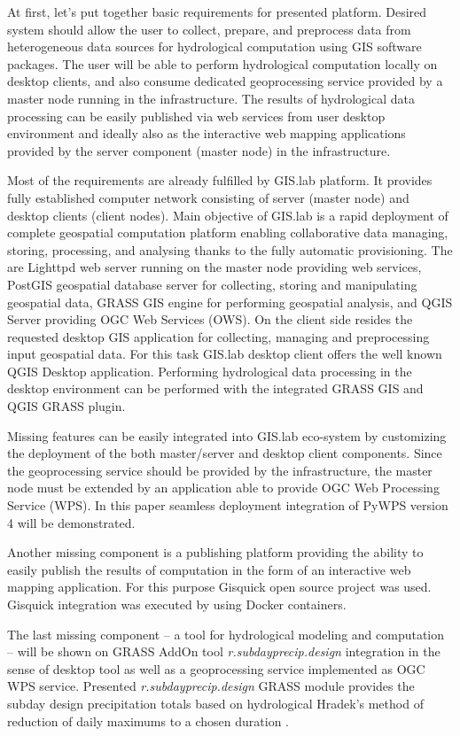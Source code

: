 \documentclass{isprs}
\begin{document}
At first, let's put together basic requirements for presented
platform. Desired system should allow the user to collect, prepare,
and preprocess data from heterogeneous data sources for hydrological
computation using GIS software packages. The user will be able to
perform hydrological computation locally on desktop clients, and also
consume dedicated geoprocessing service provided by a master node
running in the infrastructure. The results of hydrological data
processing can be easily published via web services from user desktop
environment and ideally also as the interactive web mapping
applications provided by the server component (master node) in the
infrastructure.

Most of the requirements are already fulfilled by GIS.lab platform. It
provides fully established computer network consisting of server
(master node) and desktop clients (client nodes). Main objective of
GIS.lab is a rapid deployment of complete geospatial computation
platform enabling collaborative data managing, storing, processing,
and analysing thanks to the fully automatic provisioning. The are
Lighttpd web server running on the master node providing web services,
PostGIS geospatial database server for collecting, storing and
manipulating geospatial data, GRASS GIS engine for performing
geospatial analysis, and QGIS Server providing OGC Web Services
(OWS). On the client side resides the requested desktop GIS
application for collecting, managing and preprocessing input
geospatial data. For this task GIS.lab desktop client offers the well
known QGIS Desktop application. Performing hydrological data
processing in the desktop environment can be performed with the
integrated GRASS GIS and QGIS GRASS plugin.

Missing features can be easily integrated into GIS.lab eco-system by
customizing the deployment of the both master/server and desktop
client components. Since the geoprocessing service should be provided
by the infrastructure, the master node must be extended by an
application able to provide OGC Web Processing Service (WPS). In this
paper seamless deployment integration of PyWPS version 4 will be
demonstrated.

Another missing component is a publishing platform providing the
ability to easily publish the results of computation in the form of an
interactive web mapping application. For this purpose Gisquick open
source project was used. Gisquick integration was executed by using
Docker containers.

The last missing component -- a tool for hydrological modeling and
computation -- will be shown on GRASS AddOn tool
\textit{r.subdayprecip.design} integration in the sense of desktop
tool as well as a geoprocessing service implemented as OGC WPS
service. Presented \textit{r.subdayprecip.design} GRASS module
provides the subday design precipitation totals based on hydrological
Hradek's method of reduction of daily maximums to a chosen duration
\cite{landa.2015:FOSS4GE2015}.
\end{document}

